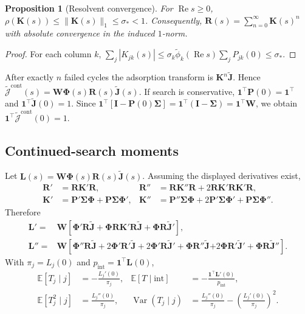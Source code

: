 \documentclass[pdflatex,sn-mathphys-num]{sn-jnl}
\numberwithin{equation}{section}
\theoremstyle{thmstyleone}%
\newtheorem{proposition}[theorem]{Proposition}
\theoremstyle{definition}
\theoremstyle{remark}
\begin{document}
\begin{appendices}
\begin{proposition}[Resolvent convergence]
\label{prop:app_resolvent_convergence}
For $\operatorname{Re}s\geq0$,
$\rho(\mathbf K(s))\leq\|\mathbf K(s)\|_1\leq\sigma_*<1$.
Consequently, $\mathbf R(s)=\sum_{n=0}^\infty\mathbf K(s)^n$ with absolute convergence in the induced $1$-norm.
\end{proposition}

\begin{proof}
For each column $k$,
$\sum_j|K_{jk}(s)|
\leq\sigma_k\widetilde\phi_k(\operatorname{Re}s)
\sum_jP_{jk}(0)\leq\sigma_*$.
\end{proof}

After exactly $n$ failed cycles the adsorption transform is
$\mathbf K^n\widetilde{\mathbf J}$. Hence
$\widetilde{\bm{\mathcal J}}^{\mathrm{cont}}(s)
=\bm W\bm\Phi(s)\mathbf R(s)\widetilde{\mathbf J}(s)$.
If search is conservative,
$\mathbf1^\top\mathbf P(0)=\mathbf1^\top$ and
$\mathbf1^\top\widetilde{\mathbf J}(0)=1$. Since
$\mathbf1^\top[\mathbf I-\mathbf P(0)\bm\Sigma]
=\mathbf1^\top(\mathbf I-\bm\Sigma)=\mathbf1^\top\bm W$,
we obtain
$\mathbf1^\top\widetilde{\bm{\mathcal J}}^{\mathrm{cont}}(0)=1$.

\subsection{Continued-search moments}

Let
$\mathbf L(s)=\bm W\bm\Phi(s)\mathbf R(s)\widetilde{\mathbf J}(s)$.
Assuming the displayed derivatives exist,
\begin{align*}
\mathbf R'&=\mathbf R\mathbf K'\mathbf R,  & \mathbf R''&=\mathbf R\mathbf K''\mathbf R
+2\mathbf R\mathbf K'\mathbf R\mathbf K'\mathbf R,\\[4pt]
\mathbf K'&=\mathbf P'\bm\Sigma\bm\Phi
+\mathbf P\bm\Sigma\bm\Phi',  &
\mathbf K''&=\mathbf P''\bm\Sigma\bm\Phi
+2\mathbf P'\bm\Sigma\bm\Phi'
+\mathbf P\bm\Sigma\bm\Phi''.
\end{align*}
Therefore
\begin{align}
\mathbf L'
={}&\bm W\left[
\bm\Phi'\mathbf R\widetilde{\mathbf J}
+\bm\Phi\mathbf R\mathbf K'\mathbf R\widetilde{\mathbf J}
+\bm\Phi\mathbf R\widetilde{\mathbf J}'\right],
\label{eq:app_L_first}\\
\mathbf L''
={}&\bm W\left[
\bm\Phi''\mathbf R\widetilde{\mathbf J}
+2\bm\Phi'\mathbf R'\widetilde{\mathbf J}
+2\bm\Phi'\mathbf R\widetilde{\mathbf J}'
+\bm\Phi\mathbf R''\widetilde{\mathbf J}\right.\left.
+2\bm\Phi\mathbf R'\widetilde{\mathbf J}'
+\bm\Phi\mathbf R\widetilde{\mathbf J}''\right].
\label{eq:app_L_second}
\end{align}
With $\pi_j=L_j(0)$ and
$p_{\mathrm{int}}=\mathbf1^\top\mathbf L(0)$,
\begin{align*}
\mathbb E[T_j\mid j]&=-\frac{L_j'(0)}{\pi_j},
&\mathbb E[T\mid\mathrm{int}]&=-\frac{\mathbf1^\top\mathbf L'(0)}
{p_{\mathrm{int}}},\\
\mathbb E[T_j^2\mid j]&=\frac{L_j''(0)}{\pi_j},
&\operatorname{Var}(T_j\mid j)&=\frac{L_j''(0)}{\pi_j}
-\left(\frac{L_j'(0)}{\pi_j}\right)^2.
\end{align*}


\end{appendices}
\end{document}
